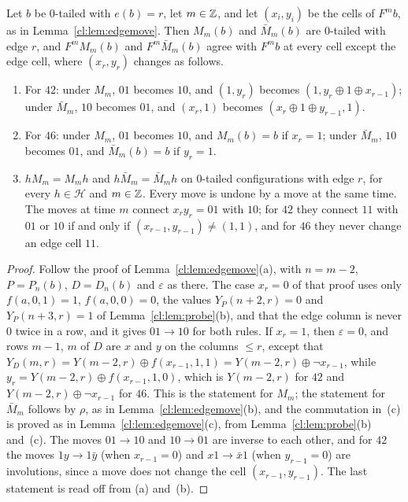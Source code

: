 \begin{lemma}\label{cl:lem:moves1446}
Let $b$ be $0$-tailed with $e(b)=r$, let $m\in\mathbb{Z}$, and let $(x_i,y_i)$ be the cells of $F^mb$, as in Lemma~\ref{cl:lem:edgemove}. Then $M_m(b)$ and $\bar M_m(b)$ are $0$-tailed with edge $r$, and $F^mM_m(b)$ and $F^m\bar M_m(b)$ agree with $F^mb$ at every cell except the edge cell, where $(x_r,y_r)$ changes as follows.
\begin{enumerate}
\item[(a)] For $42$: under $M_m$, $01$ becomes $10$, and $(1,y_r)$ becomes $(1,y_r\oplus1\oplus x_{r-1})$; under $\bar M_m$, $10$ becomes $01$, and $(x_r,1)$ becomes $(x_r\oplus1\oplus y_{r-1},1)$.
\item[(b)] For $46$: under $M_m$, $01$ becomes $10$, and $M_m(b)=b$ if $x_r=1$; under $\bar M_m$, $10$ becomes $01$, and $\bar M_m(b)=b$ if $y_r=1$.
\item[(c)] $hM_m=M_mh$ and $h\bar M_m=\bar M_mh$ on $0$-tailed configurations with edge $r$, for every $h\in\mathcal H$ and $m\in\mathbb{Z}$. Every move is undone by a move at the same time. The moves at time $m$ connect $x_ry_r=01$ with $10$; for $42$ they connect $11$ with $01$ or $10$ if and only if $(x_{r-1},y_{r-1})\ne(1,1)$, and for $46$ they never change an edge cell $11$.
\end{enumerate}
\end{lemma}

\begin{proof}
Follow the proof of Lemma~\ref{cl:lem:edgemove}(a), with $n=m-2$, $P=P_n(b)$, $D=D_n(b)$ and $\varepsilon$ as there. The case $x_r=0$ of that proof uses only $f(a,0,1)=1$, $f(a,0,0)=0$, the values $Y_P(n+2,r)=0$ and $Y_P(n+3,r)=1$ of Lemma~\ref{cl:lem:probe}(b), and that the edge column is never $0$ twice in a row, and it gives $01\to10$ for both rules. If $x_r=1$, then $\varepsilon=0$, and rows $m-1$, $m$ of $D$ are $x$ and $y$ on the columns $\le r$, except that $Y_D(m,r)=Y(m-2,r)\oplus f(x_{r-1},1,1)=Y(m-2,r)\oplus\neg x_{r-1}$, while $y_r=Y(m-2,r)\oplus f(x_{r-1},1,0)$, which is $Y(m-2,r)$ for $42$ and $Y(m-2,r)\oplus\neg x_{r-1}$ for $46$. This is the statement for $M_m$; the statement for $\bar M_m$ follows by $\rho$, as in Lemma~\ref{cl:lem:edgemove}(b), and the commutation in~(c) is proved as in Lemma~\ref{cl:lem:edgemove}(c), from Lemma~\ref{cl:lem:probe}(b) and~(c). The moves $01\to10$ and $10\to01$ are inverse to each other, and for $42$ the moves $1y\to1\bar y$ (when $x_{r-1}=0$) and $x1\to\bar x1$ (when $y_{r-1}=0$) are involutions, since a move does not change the cell $(x_{r-1},y_{r-1})$. The last statement is read off from (a) and~(b).
\end{proof}

